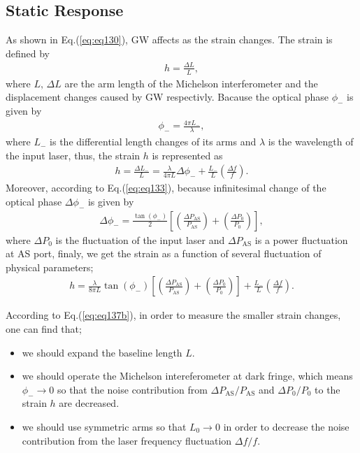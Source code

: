 \subsection{Static Response} \label{sec:sec122}
As shown in Eq.(\ref{eq:eq130}), GW affects as the strain changes. The strain is defined by
\begin{eqnarray}
  h = \frac{\Delta{L}}{L}, \label{eq:eq134a}
\end{eqnarray}
where $L,\,\Delta{L}$ are the arm length of the Michelson interferometer and the displacement changes caused by GW respectivly. Bacause the optical phase $\phi_{-}$ is given by
\begin{eqnarray}
  \phi_{-}=\frac{4\pi{L_{-}}}{\lambda},
\end{eqnarray}
where $L_{-}$ is the differential length changes of its arms and $\lambda$ is the wavelength of the input laser, thus, the strain $h$ is represented as 
\begin{eqnarray}
  h = \frac{\Delta{L_{-}}}{L} = \frac{\lambda}{4\pi{L}}\Delta{\phi_{-}} + \frac{L_{-}}{L}\left(\frac{\Delta{f}}{f}\right). \label{eq:eq133_a}
\end{eqnarray}
Moreover, according to Eq.(\ref{eq:eq133}), because infinitesimal change of the optical phase $\Delta{\phi_{-}}$ is given by 
\begin{eqnarray}
  \Delta{\phi_{-}} = \frac{\tan{(\phi_{-})}}{2} \left[\left(\frac{\Delta P_{\mathrm{AS}}}{P_{\mathrm{AS}}}\right) + \left(\frac{\Delta{P_0}}{P_0}\right) \right],
\end{eqnarray}
where $\Delta{P_0}$ is the fluctuation of the input laser and $\Delta{P_{\mathrm{AS}}}$ is a power fluctuation at AS port, finaly, we get the strain as a function of several fluctuation of physical parameters;
\begin{eqnarray}
  h = \frac{\lambda}{8\pi{L}}\tan{(\phi_{-})} \left[\left(\frac{\Delta P_{\mathrm{AS}}}{P_{\mathrm{AS}}}\right) + \left(\frac{\Delta{P_0}}{P_0}\right) \right] + \frac{L_{-}}{L}\left(\frac{\Delta{f}}{f}\right). \label{eq:eq137b}
\end{eqnarray}

According to Eq.(\ref{eq:eq137b}), in order to measure the smaller strain changes, one can find that;
\begin{itemize}
  \setlength{\itemsep}{1pt}      %
  \setlength{\parskip}{-1pt}     %
  \setlength{\itemindent}{0pt}   %
  \setlength{\labelsep}{5pt}     %
\item we should expand the baseline length $L$.
\item we should operate the Michelson intereferometer at dark fringe, which means $\phi_{-}\to0$ so that the noise contribution from $\Delta P_{\mathrm{AS}}/P_{\mathrm{AS}}$ and $\Delta{P_0}/P_0$ to the strain $h$ are decreased.
\item we should use symmetric arms so that $L_{0}\to0$ in order to decrease the noise contribution from the laser frequency fluctuation $\Delta{f}/{f}$.
\end{itemize}



